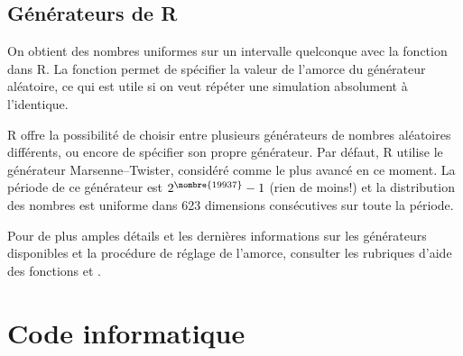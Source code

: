 \subsection{Générateurs de R}

On obtient des nombres uniformes sur un intervalle quelconque avec la
fonction  dans R. La fonction  permet de
spécifier la valeur de l'amorce du générateur aléatoire, ce qui est
utile si on veut répéter une simulation absolument à l'identique.

R offre la possibilité de choisir entre plusieurs générateurs de
nombres aléatoires différents, ou encore de spécifier son propre
générateur. Par défaut, R utilise le générateur Marsenne--Twister,
considéré comme le plus avancé en ce moment. La période de ce
générateur est $2^{\nombre{19937}} - 1$ (rien de moins!) et la
distribution des nombres est uniforme dans 623 dimensions consécutives
sur toute la période.

Pour de plus amples détails et les dernières informations sur les
générateurs disponibles et la procédure de réglage de l'amorce,
consulter les rubriques d'aide des fonctions  et
.


\section{Code informatique}
\label{sec:generation:code}



\vfill



